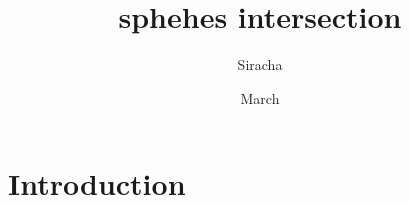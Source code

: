 \documentclass{article}
\title{sphehes intersection}
\author{Siracha}
\date{March }
\begin{document}
\maketitle

\section{Introduction}
\end{document}
